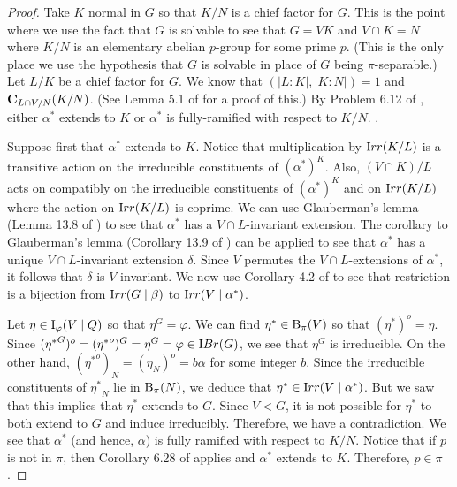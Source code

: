 \documentclass[12pt]{article}
\def\irr#1{{\textrm  Irr}(#1)}
\def\ibr#1{{\textrm IBr} (#1)}
\def\cent#1#2{{\bf C}_{#1}(#2)}
\def\B#1#2{{\textrm B}_{#1} (#2)}
\def\Bpi#1{\B {\pi}{#1}}
\def\phi{\varphi}
\newcommand \IIpi[3] {{\textrm I}_{#1} (#2 \mid #3)}
\begin{document}
\begin{proof}
Take $K$ normal in $G$ so that $K/N$ is a chief factor for $G$. This
is the point where we use the fact that $G$ is solvable to see that
$G = VK$ and $V \cap K = N$ where $K/N$ is an elementary abelian
$p$-group for some prime $p$.  (This is the only place we use the
hypothesis that $G$ is solvable in place of $G$ being
$\pi$-separable.)
%
%
Let $L/K$ be a chief factor for $G$.  We know that $(|L:K|,|K:N|) =
1$ and $\cent {L \cap V/N}{K/N}$.  (See Lemma 5.1 of \cite{max} for
a proof of this.)  By Problem 6.12 of \cite{text}, either $\alpha^*$
extends to $K$ or $\alpha^*$ is fully-ramified with respect to
$K/N$.  .

Suppose first that $\alpha^*$ extends to $K$. Notice that
multiplication by $\irr {K/L}$ is a transitive action on the
irreducible constituents of $(\alpha^*)^K$.  Also, $(V \cap K)/L$
acts on compatibly on the irreducible constituents of $(\alpha^*)^K$
and on $\irr {K/L}$ where the action on $\irr {K/L}$ is coprime.  We
can use Glauberman's lemma (Lemma 13.8 of \cite{text}) to see that
$\alpha^*$ has a $V \cap L$-invariant extension.  The corollary to
Glauberman's lemma (Corollary 13.9 of \cite{text}) can be applied to
see that $\alpha^*$ has a unique $V \cap L$-invariant extension
$\delta$. Since $V$ permutes the $V \cap L$-extensions of
$\alpha^*$, it follows that $\delta$ is $V$-invariant.  We now use
Corollary 4.2 of \cite{pisep} to see that restriction is a bijection
from $\irr {G \mid \beta}$ to $\irr {V \mid \alpha^*}$.

Let $\eta \in \IIpi {\phi}VQ$ so that $\eta^G = \phi$.  We can find
$\eta^* \in \Bpi V$ so that $(\eta^*)^o = \eta$. Since
$({\eta^*}^G)^o = ({\eta^*}^o)^G = \eta^G = \phi \in \ibr G$, we see
that $\eta^G$ is irreducible.  On the other hand, $({\eta^*}^o)_N =
(\eta_N)^o = b \alpha$ for some integer $b$.  Since the irreducible
constituents of ${\eta^*}_N$ lie in $\Bpi N$, we deduce that $\eta^*
\in \irr {V \mid \alpha^*}$.  But we saw that this implies that
$\eta^*$ extends to $G$.  Since $V < G$, it is not possible for
$\eta^*$ to both extend to $G$ and induce irreducibly.  Therefore,
we have a contradiction.  We see that $\alpha^*$ (and hence,
$\alpha$) is fully ramified with respect to $K/N$.  Notice that if
$p$ is not in $\pi$, then Corollary 6.28 of \cite{text} applies and
$\alpha^*$ extends to $K$. Therefore, $p \in \pi$.


\end{proof}
\end{document}
